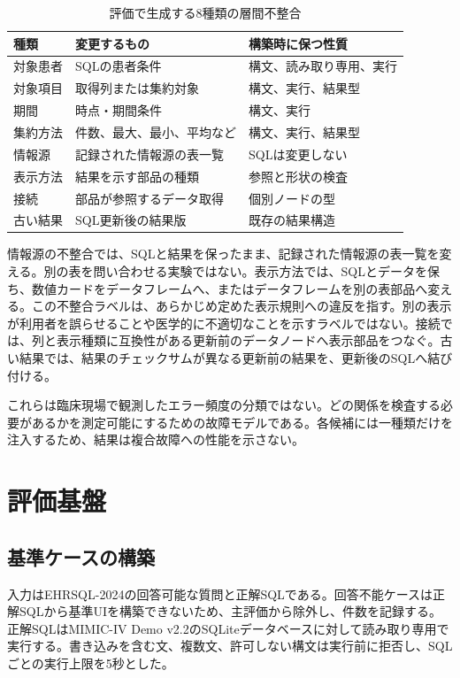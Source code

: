 \documentclass[manuscript,review,anonymous]{acmart}
\begin{document}
\begin{table}[t]
  \caption{評価で生成する8種類の層間不整合}
  \label{tab:mutations}
  \begin{tabularx}{\linewidth}{lYY}
    \toprule
    種類 & 変更するもの & 構築時に保つ性質 \\
    \midrule
    対象患者 & SQLの患者条件 & 構文、読み取り専用、実行 \\
    対象項目 & 取得列または集約対象 & 構文、実行、結果型 \\
    期間 & 時点・期間条件 & 構文、実行 \\
    集約方法 & 件数、最大、最小、平均など & 構文、実行、結果型 \\
    情報源 & 記録された情報源の表一覧 & SQLは変更しない \\
    表示方法 & 結果を示す部品の種類 & 参照と形状の検査 \\
    接続 & 部品が参照するデータ取得 & 個別ノードの型 \\
    古い結果 & SQL更新後の結果版 & 既存の結果構造 \\
    \bottomrule
  \end{tabularx}
\end{table}

情報源の不整合では、SQLと結果を保ったまま、記録された情報源の表一覧を変える。別の表を問い合わせる実験ではない。表示方法では、SQLとデータを保ち、数値カードをデータフレームへ、またはデータフレームを別の表部品へ変える。この不整合ラベルは、あらかじめ定めた表示規則への違反を指す。別の表示が利用者を誤らせることや医学的に不適切なことを示すラベルではない。接続では、列と表示種類に互換性がある更新前のデータノードへ表示部品をつなぐ。古い結果では、結果のチェックサムが異なる更新前の結果を、更新後のSQLへ結び付ける。

これらは臨床現場で観測したエラー頻度の分類ではない。どの関係を検査する必要があるかを測定可能にするための故障モデルである。各候補には一種類だけを注入するため、結果は複合故障への性能を示さない。

\section{評価基盤}

\subsection{基準ケースの構築}

入力はEHRSQL-2024の回答可能な質問と正解SQLである。回答不能ケースは正解SQLから基準UIを構築できないため、主評価から除外し、件数を記録する。正解SQLはMIMIC-IV Demo v2.2のSQLiteデータベースに対して読み取り専用で実行する。書き込みを含む文、複数文、許可しない構文は実行前に拒否し、SQLごとの実行上限を5秒とした。
\end{document}
